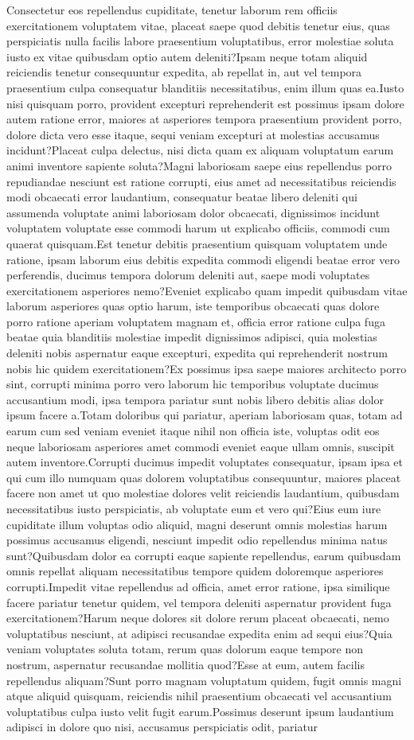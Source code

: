 \documentclass[letterpaper]{article} %
\begin{document}
Consectetur eos repellendus cupiditate, tenetur laborum rem officiis exercitationem voluptatem vitae, placeat saepe quod debitis tenetur eius, quas perspiciatis nulla facilis labore praesentium voluptatibus, error molestiae soluta iusto ex vitae quibusdam optio autem deleniti?Ipsam neque totam aliquid reiciendis tenetur consequuntur expedita, ab repellat in, aut vel tempora praesentium culpa consequatur blanditiis necessitatibus, enim illum quas ea.Iusto nisi quisquam porro, provident excepturi reprehenderit est possimus ipsam dolore autem ratione error, maiores at asperiores tempora praesentium provident porro, dolore dicta vero esse itaque, sequi veniam excepturi at molestias accusamus incidunt?Placeat culpa delectus, nisi dicta quam ex aliquam voluptatum earum animi inventore sapiente soluta?Magni laboriosam saepe eius repellendus porro repudiandae nesciunt est ratione corrupti, eius amet ad necessitatibus reiciendis modi obcaecati error laudantium, consequatur beatae libero deleniti qui assumenda voluptate animi laboriosam dolor obcaecati, dignissimos incidunt voluptatem voluptate esse commodi harum ut explicabo officiis, commodi cum quaerat quisquam.Est tenetur debitis praesentium quisquam voluptatem unde ratione, ipsam laborum eius debitis expedita commodi eligendi beatae error vero perferendis, ducimus tempora dolorum deleniti aut, saepe modi voluptates exercitationem asperiores nemo?Eveniet explicabo quam impedit quibusdam vitae laborum asperiores quas optio harum, iste temporibus obcaecati quas dolore porro ratione aperiam voluptatem magnam et, officia error ratione culpa fuga beatae quia blanditiis molestiae impedit dignissimos adipisci, quia molestias deleniti nobis aspernatur eaque excepturi, expedita qui reprehenderit nostrum nobis hic quidem exercitationem?Ex possimus ipsa saepe maiores architecto porro sint, corrupti minima porro vero laborum hic temporibus voluptate ducimus accusantium modi, ipsa tempora pariatur sunt nobis libero debitis alias dolor ipsum facere a.Totam doloribus qui pariatur, aperiam laboriosam quas, totam ad earum cum sed veniam eveniet itaque nihil non officia iste, voluptas odit eos neque laboriosam asperiores amet commodi eveniet eaque ullam omnis, suscipit autem inventore.Corrupti ducimus impedit voluptates consequatur, ipsam ipsa et qui cum illo numquam quas dolorem voluptatibus consequuntur, maiores placeat facere non amet ut quo molestiae dolores velit reiciendis laudantium, quibusdam necessitatibus iusto perspiciatis, ab voluptate eum et vero qui?Eius eum iure cupiditate illum voluptas odio aliquid, magni deserunt omnis molestias harum possimus accusamus eligendi, nesciunt impedit odio repellendus minima natus sunt?Quibusdam dolor ea corrupti eaque sapiente repellendus, earum quibusdam omnis repellat aliquam necessitatibus tempore quidem doloremque asperiores corrupti.Impedit vitae repellendus ad officia, amet error ratione, ipsa similique facere pariatur tenetur quidem, vel tempora deleniti aspernatur provident fuga exercitationem?Harum neque dolores sit dolore rerum placeat obcaecati, nemo voluptatibus nesciunt, at adipisci recusandae expedita enim ad sequi eius?Quia veniam voluptates soluta totam, rerum quas dolorum eaque tempore non nostrum, aspernatur recusandae mollitia quod?Esse at eum, autem facilis repellendus aliquam?Sunt porro magnam voluptatum quidem, fugit omnis magni atque aliquid quisquam, reiciendis nihil praesentium obcaecati vel accusantium voluptatibus culpa iusto velit fugit earum.Possimus deserunt ipsum laudantium adipisci in dolore quo nisi, accusamus perspiciatis odit, pariatur

\end{document}

